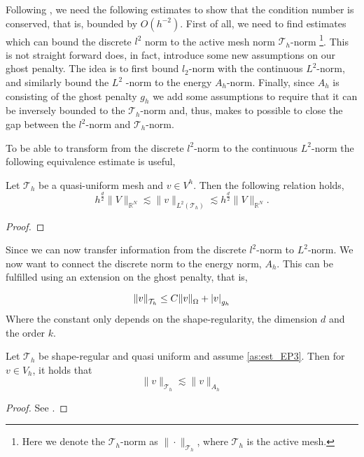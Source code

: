  Following \cite{gurkan2019stabilized}, we need the following estimates to show that the condition number is conserved, that is, bounded by $O( h^{-2}) $. First of all, we need to find estimates which can bound the discrete $l^{2}$ norm to the active
 mesh norm  $\mathcal{T} _{h}$-norm \footnote{Here we denote the $\mathcal{T} _{h}$-norm as $\| \cdot  \|_{\mathcal{T} _{h}  }^{  } $, where $\mathcal{T} _{h}$ is the active mesh.}. This is not straight forward does, in fact, introduce some new
 assumptions on our ghost penalty. The idea is to first bound $l_{2}$-norm with the continuous $L^{2}$-norm, and similarly bound the $L^{2}$ -norm to the energy $A_{h}$-norm. Finally, since $A_{h}$ is consisting of the ghost penalty $g_{h}$ we add
 some assumptions to require that it can be inversely bounded to the $\mathcal{T} _{h}$-norm and, thus, makes to possible to close the gap between the $l^{2}$-norm and $\mathcal{T} _{h}$-norm.

 To be able to transform from the discrete $l^{2}$-norm to the continuous $L^{2} $-norm the following equivalence estimate is useful,
 \begin{proposition}
 \label{prop:inverse_relation}
     Let $\mathcal{T}_{h} $ be a quasi-uniform mesh and $v \in V^{h}$. Then the following relation holds,
 \begin{equation}
 h^{\frac{d}{2}} \| V \|_{ \mathbb{R} ^{N} }^{  }  \lesssim \| v \|_{ L^2( \mathcal{T} _{h})  }^{  } \lesssim h^{\frac{d}{2}} \| V \|_{\mathbb{R} ^{N}  }^{  }.
 \end{equation}
 \end{proposition}
 \begin{proof}
 \end{proof}

 Since we can now transfer information from the discrete $l^{2} $-norm to $L^{2}$-norm. We now want to connect the discrete norm to the energy norm, $A_{h}$. This can be fulfilled using an extension on the ghost penalty, that is,

 \begin{assumption}[EP3]
     \label{as:est_EP3}
 \[
 \| v \|_{ \mathcal{T}_{h}  }^{  } \le  C \| v \|_{ \Omega  }^{  }  + \left\lvert  v  \right\rvert _{g_{h}}
 \]
 Where the constant only depends on the shape-regularity, the dimension $d$ and the order $k$.
 \end{assumption}


 \begin{proposition}
     Let $\mathcal{T}_{h} $ be shape-regular and quasi uniform and assume \ref{as:est_EP3}. Then for $v \in V_{h}$, it holds that \[
     \| v \|_{ \mathcal{T} _{h} }^{  } \lesssim \| v \|_{ A_{h} }^{  }
     \]

 \end{proposition}
\begin{proof}
    See \cite{gurkan2019stabilized}.
\end{proof}



